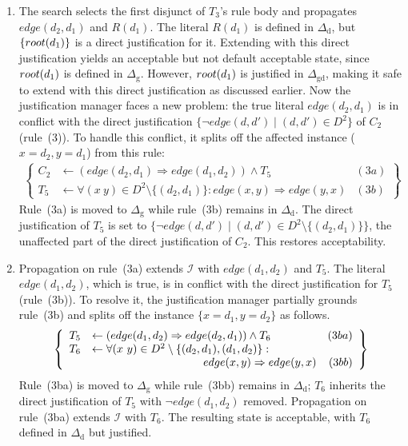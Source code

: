 \documentclass[11pt]{article}
\newcommand{\m}[1]{\ensuremath{#1}\xspace}
\newcommand{\limplies}{\m{\Rightarrow}}
\newcommand{\lrule}{\m{\leftarrow}}
\newcommand{\I}{\m{\mathcal{I}}}
\newcommand{\D}{\m{\Delta}}
\newcommand{\typed}[2]{\m{#1\in #2:}}
\theoremstyle{plain}
\theoremstyle{definition}
\theoremstyle{example_basic}
\theoremstyle{example_contd}
\theoremstyle{plain}
\newcommand{\Dg}{\ensuremath{\D_\text{g}}\xspace}
\newcommand{\Dd}{\ensuremath{\D_\text{d}}\xspace}
\newcommand{\Dgd}{\ensuremath{\D_\text{gd}}\xspace}
\newcommand{\change}[1]{#1}
\begin{document}
\begin{enumerate}
\item The search selects the first disjunct of $T_3$'s rule body and propagates  $edge(d_2,d_1)$ and $R(d_1)$. The literal $R(d_1)$ is defined in \Dd, but $\{root(d_1)\}$ is a direct justification for it. \change{Extending \jgraph with this direct justification yields an acceptable but not default acceptable state, since $root(d_1)$ is defined in \Dg. However,  $root(d_1)$ is justified in \Dgd, making it safe to extend \jgraph with this direct justification as discussed earlier.} \change{Now the justification manager faces a new problem: the true literal $edge(d_2,d_1)$ is in conflict with the direct justification $\{\lnot edge(d,d')\mid (d,d')\in D^2\}$ of $C_2$ (rule~(3)). To handle this conflict, it splits off the affected instance ($x=d_2,y=d_1$) from this rule:}
\[\begin{array}{c}
    \left\{\begin{array}{rlr}
        C_2 &\lrule (edge(d_2,d_1) \limplies edge(d_1,d_2)) \land T_5   & (3a) \\
        T_5 &\lrule \forall \typed{(x~y)}{D^2\setminus\{(d_2,d_1)\}} edge(x,y) \limplies edge(y,x)  & (3b) 
      \end{array}\right\}
  \end{array}\]
  Rule~(3a) is moved to \Dg while rule~(3b) remains in \Dd. 
  \change{The direct justification of  $T_5$ is set to $\{\lnot edge(d,d')\mid (d,d')\in D^2 \setminus \{(d_2,d_1)\}\}$, the unaffected part of the direct justification of $C_2$. This restores acceptability.}

\item Propagation on rule~(3a) extends \I with $edge(d_1,d_2)$ and
  $T_5$. 
The literal $edge(d_1,d_2)$, which is true, is in conflict with the direct
  justification for $T_5$ (rule~(3b)). To resolve it, the justification manager partially grounds rule~(3b) and splits off the instance $\{x=d_1,y=d_2\}$ as follows.
  \[\begin{array}{c}
    \left\{\begin{array}{rlr}
        T_5 &\lrule (edge(d_1,d_2) \limplies edge(d_2,d_1)) \land T_6 & (3ba) \\
        T_6 &\lrule \forall \typed{(x~y)}{D^2\setminus\{(d_2,d_1),
          (d_1,d_2)\}}\\ 
            & \hspace{3.5cm} edge(x,y) \limplies edge(y,x)  & (3bb) 
      \end{array}\right\}
  \end{array}\]
  Rule~(3ba) is moved to \Dg while rule~(3bb) remains in \Dd; $T_6$ inherits the direct justification of $T_5$ with $\lnot edge(d_1,d_2)$ removed. Propagation on rule~(3ba) extends \I with $T_6$. The resulting state is acceptable, with $T_6$ defined in \Dd but justified. 
\end{enumerate}
\end{document}
